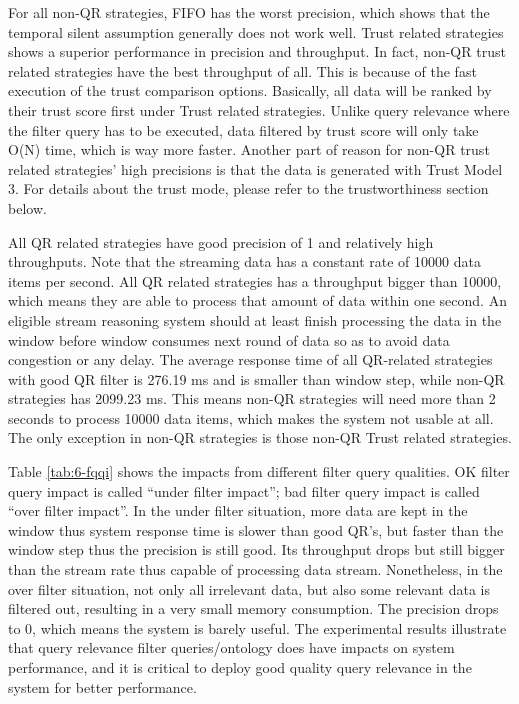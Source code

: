 For all non-QR strategies, FIFO has the worst precision, which shows that the temporal silent assumption generally does not work well.
Trust related strategies shows a superior performance in precision and throughput. 
In fact, non-QR trust related strategies have the best throughput of all.
This is because of the fast execution of the trust comparison options.
Basically, all data will be ranked by their trust score first under Trust related strategies. 
Unlike query relevance where the filter query has to be executed, data filtered by trust score will only take O(N) time, which is way more faster.
Another part of reason for non-QR trust related strategies' high precisions is that the data is generated with Trust Model 3. 
For details about the trust mode, please refer to the trustworthiness section below. 

All QR related strategies have good precision of 1 and relatively high throughputs. 
Note that the streaming data has a constant rate of 10000 data items per second. 
All QR related strategies has a throughput bigger than 10000, which means they are able to process that amount of data within one second.
An eligible stream reasoning system should at least finish processing the data in the window before window consumes next round of data so as to avoid data congestion or any delay. 
The average response time of all QR-related strategies with good QR filter is 276.19 ms and is smaller than window step, while non-QR strategies has 2099.23 ms. 
This means non-QR strategies will need more than 2 seconds to process 10000 data items, which makes the system not usable at all. 
The only exception in non-QR strategies is those non-QR Trust related strategies. 

Table \ref{tab:6-fqqi} shows the impacts from different filter query qualities. 
OK filter query impact is called ``under filter impact''; bad filter query impact is called ``over filter impact''.
In the under filter situation, more data are kept in the window thus system response time is slower than good QR's, but faster than the window step thus the precision is still good.
Its throughput drops but still bigger than the stream rate thus capable of processing data stream. 
Nonetheless, in the over filter situation, not only all irrelevant data, but also some relevant data is filtered out, resulting in a very small memory consumption. 
The precision drops to 0, which means the system is barely useful.
The experimental results illustrate that query relevance filter queries/ontology does have impacts on system performance, and it is critical to deploy good quality query relevance in the system for better performance. 
%
